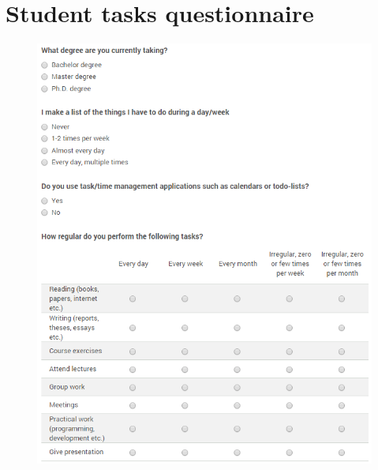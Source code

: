 \section{Student tasks questionnaire}

\begin{figure}[tbp]
\includegraphics[width=\columnwidth]{appendix/StudentTasks1.PNG}
\caption{}
\label{}
\end{figure}

